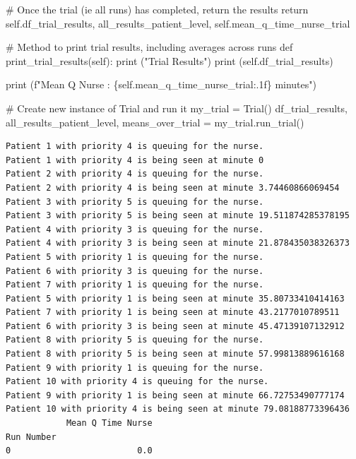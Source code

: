 \documentclass[
  letterpaper,
  DIV=11,
  numbers=noendperiod]{scrreprt}
\newenvironment{Shaded}{\begin{snugshade}}{\end{snugshade}}
\newcommand{\BuiltInTok}[1]{\textcolor[rgb]{0.00,0.23,0.31}{#1}}
\newcommand{\CommentTok}[1]{\textcolor[rgb]{0.37,0.37,0.37}{#1}}
\newcommand{\ControlFlowTok}[1]{\textcolor[rgb]{0.00,0.23,0.31}{#1}}
\newcommand{\KeywordTok}[1]{\textcolor[rgb]{0.00,0.23,0.31}{#1}}
\newcommand{\NormalTok}[1]{\textcolor[rgb]{0.00,0.23,0.31}{#1}}
\newcommand{\OperatorTok}[1]{\textcolor[rgb]{0.37,0.37,0.37}{#1}}
\newcommand{\SpecialCharTok}[1]{\textcolor[rgb]{0.37,0.37,0.37}{#1}}
\newcommand{\SpecialStringTok}[1]{\textcolor[rgb]{0.13,0.47,0.30}{#1}}
\newcommand{\StringTok}[1]{\textcolor[rgb]{0.13,0.47,0.30}{#1}}
\newcommand{\VariableTok}[1]{\textcolor[rgb]{0.07,0.07,0.07}{#1}}
\begin{document}
\begin{tcolorbox}
\begin{Shaded}
\begin{Highlighting}[]
        \CommentTok{\# Once the trial (ie all runs) has completed, return the results}
        \ControlFlowTok{return} \VariableTok{self}\NormalTok{.df\_trial\_results, all\_results\_patient\_level, }\VariableTok{self}\NormalTok{.mean\_q\_time\_nurse\_trial}

    \CommentTok{\# Method to print trial results, including averages across runs}
    \KeywordTok{def}\NormalTok{ print\_trial\_results(}\VariableTok{self}\NormalTok{):}
        \BuiltInTok{print}\NormalTok{ (}\StringTok{"Trial Results"}\NormalTok{)}
        \BuiltInTok{print}\NormalTok{ (}\VariableTok{self}\NormalTok{.df\_trial\_results)}

        \BuiltInTok{print}\NormalTok{ (}\SpecialStringTok{f"Mean Q Nurse : }\SpecialCharTok{\{}\VariableTok{self}\SpecialCharTok{.}\NormalTok{mean\_q\_time\_nurse\_trial}\SpecialCharTok{:.1f\}}\SpecialStringTok{ minutes"}\NormalTok{)}

\CommentTok{\# Create new instance of Trial and run it}
\NormalTok{my\_trial }\OperatorTok{=}\NormalTok{ Trial()}
\NormalTok{df\_trial\_results, all\_results\_patient\_level, means\_over\_trial  }\OperatorTok{=}\NormalTok{ my\_trial.run\_trial()}
\end{Highlighting}
\end{Shaded}

\begin{verbatim}
Patient 1 with priority 4 is queuing for the nurse.
Patient 1 with priority 4 is being seen at minute 0
Patient 2 with priority 4 is queuing for the nurse.
Patient 2 with priority 4 is being seen at minute 3.74460866069454
Patient 3 with priority 5 is queuing for the nurse.
Patient 3 with priority 5 is being seen at minute 19.511874285378195
Patient 4 with priority 3 is queuing for the nurse.
Patient 4 with priority 3 is being seen at minute 21.878435038326373
Patient 5 with priority 1 is queuing for the nurse.
Patient 6 with priority 3 is queuing for the nurse.
Patient 7 with priority 1 is queuing for the nurse.
Patient 5 with priority 1 is being seen at minute 35.80733410414163
Patient 7 with priority 1 is being seen at minute 43.2177010789511
Patient 6 with priority 3 is being seen at minute 45.47139107132912
Patient 8 with priority 5 is queuing for the nurse.
Patient 8 with priority 5 is being seen at minute 57.99813889616168
Patient 9 with priority 1 is queuing for the nurse.
Patient 10 with priority 4 is queuing for the nurse.
Patient 9 with priority 1 is being seen at minute 66.72753490777174
Patient 10 with priority 4 is being seen at minute 79.08188773396436
            Mean Q Time Nurse
Run Number                   
0                         0.0
\end{verbatim}

\end{tcolorbox}
\end{document}

